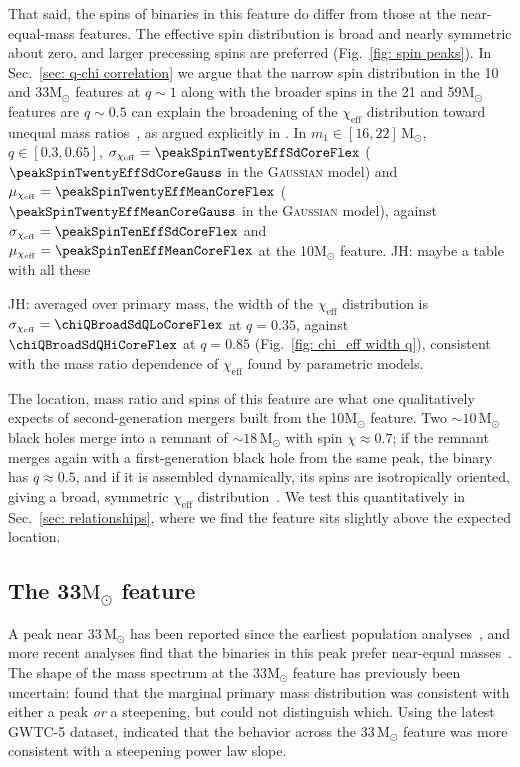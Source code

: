 \documentclass[%
 reprint,
 amsmath,amssymb,
 aps,
 prl,
 nofootinbib,nobibnotes,
]{revtex4-2}
\newcommand{\Msun}{\ensuremath{\mathrm{M}_{\odot}}}
\newcommand{\chieff}{\ensuremath{\chi_{\mathrm{eff}}}}
\newcommand{\jh}[1]{{\color{orange}JH: #1}}
\newcommand{\gaussianspins}{\textsc{Gaussian}\xspace}
\newcommand{\featTen}{10\xspace}
\newcommand{\featTwenty}{21\xspace}
\newcommand{\featThirtyFive}{33\xspace}
\newcommand{\featSixty}{59\xspace}
\begin{document}
That said, the spins of binaries in this feature do differ from those at the near-equal-mass features. The effective spin distribution is broad and nearly symmetric about zero, and larger precessing spins are preferred (Fig.~\ref{fig: spin peaks}). In Sec.~\ref{sec: q-chi correlation} we argue that the narrow spin distribution in the \featTen and \featThirtyFive $\Msun$ features at $q\sim1$ along with the broader spins in the \featTwenty and \featSixty $\Msun$ features are $q\sim 0.5$ can explain the broadening of the $\chieff$ distribution toward unequal mass ratios~\cite{Callister:2021fpo, Adamcewicz:2023mov, LIGOScientific:2026ctl}, as argued explicitly in \citet{Vijaykumar:2026zjy}. In $m_1 \in [16, 22]\,\Msun$, $q \in [0.3, 0.65]$, $\sigma_{\chieff} = \peakSpinTwentyEffSdCoreFlex$ ($\peakSpinTwentyEffSdCoreGauss$ in the \gaussianspins model) and $\mu_{\chieff} = \peakSpinTwentyEffMeanCoreFlex$ ($\peakSpinTwentyEffMeanCoreGauss$ in the \gaussianspins model), against $\sigma_{\chieff} = \peakSpinTenEffSdCoreFlex$ and $\mu_{\chieff} = \peakSpinTenEffMeanCoreFlex$ at the \featTen $\Msun$ feature. \jh{maybe a table with all these}

\jh{averaged over primary mass, the width of the $\chieff$ distribution is $\sigma_{\chieff} = \chiQBroadSdQLoCoreFlex$ at $q = 0.35$, against $\chiQBroadSdQHiCoreFlex$ at $q = 0.85$ (Fig.~\ref{fig: chi_eff width q}), consistent with the mass ratio dependence of $\chieff$ found by parametric models. }

The location, mass ratio and spins of this feature are what one qualitatively expects of second-generation mergers built from the \featTen $\Msun$ feature. Two $\sim \featTen\,\Msun$ black holes merge into a remnant of $\sim 18\,\Msun$ with spin $\chi \approx 0.7$; if the remnant merges again with a first-generation black hole from the same peak, the binary has $q \approx 0.5$, and if it is assembled dynamically, its spins are isotropically oriented, giving a broad, symmetric $\chieff$ distribution~\cite{Fishbach:2017dwv, Gerosa:2017kvu, Rodriguez:2019huv, Gerosa:2021mno, Ginat:2026awh}. We test this quantitatively in Sec.~\ref{sec: relationships}, where we find the feature sits slightly above the expected location. 

\subsection{The \featThirtyFive $\Msun$ feature}

A peak near $\featThirtyFive\,\Msun$ has been reported since the earliest population analyses~\cite{Talbot:2018cva, LIGOScientific:2018jsj, LIGOScientific:2020kqk, KAGRA:2021duu, Farah:2023vsc}, and more recent analyses find that the binaries in this peak prefer near-equal masses~\cite{Roy:2025ktr, Sridhar:2025kvi}. The shape of the mass spectrum at the \featThirtyFive $\Msun$ feature has previously been uncertain: \citet{LIGOScientific:2025pvj} found that the marginal primary mass distribution was consistent with either a peak \textit{or} a steepening, but could not distinguish which. Using the latest \ac{GWTC-5} dataset, \citet{LIGOScientific:2026ctl} indicated that the behavior across the $\featThirtyFive\,\Msun$ feature was more consistent with a steepening power law slope. 
\end{document}
